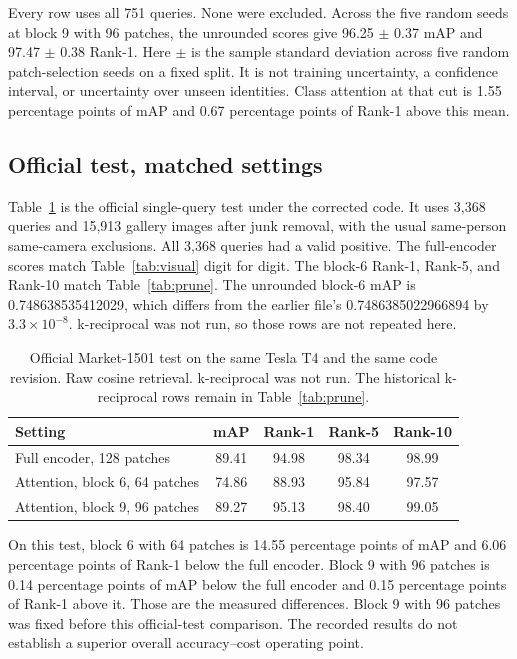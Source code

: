 \documentclass[11pt]{article}
\begin{document}
Every row uses all 751 queries. None were excluded.
Across the five random seeds at block 9 with 96 patches, the unrounded scores give 96.25 $\pm$ 0.37 mAP and 97.47 $\pm$ 0.38 Rank-1.
Here $\pm$ is the sample standard deviation across five random patch-selection seeds on a fixed split.
It is not training uncertainty, a confidence interval, or uncertainty over unseen identities.
Class attention at that cut is 1.55 percentage points of mAP and 0.67 percentage points of Rank-1 above this mean.

\FloatBarrier
\subsection{Official test, matched settings}
Table~\ref{tab:official} is the official single-query test under the corrected code.
It uses 3{,}368 queries and 15{,}913 gallery images after junk removal, with the usual same-person same-camera exclusions.
All 3{,}368 queries had a valid positive.
The full-encoder scores match Table~\ref{tab:visual} digit for digit.
The block-6 Rank-1, Rank-5, and Rank-10 match Table~\ref{tab:prune}.
The unrounded block-6 mAP is 0.748638535412029, which differs from the earlier file's 0.7486385022966894 by $3.3 \times 10^{-8}$.
k-reciprocal was not run, so those rows are not repeated here.

\begin{table}[t]
\centering
\caption{Official Market-1501 test on the same Tesla T4 and the same code revision. Raw cosine retrieval. k-reciprocal was not run. The historical k-reciprocal rows remain in Table~\ref{tab:prune}.}
\label{tab:official}
\small
\begin{tabular}{lcccc}
\toprule
Setting & mAP & Rank-1 & Rank-5 & Rank-10 \\
\midrule
Full encoder, 128 patches & 89.41 & 94.98 & 98.34 & 98.99 \\
Attention, block 6, 64 patches & 74.86 & 88.93 & 95.84 & 97.57 \\
Attention, block 9, 96 patches & 89.27 & 95.13 & 98.40 & 99.05 \\
\bottomrule
\end{tabular}
\end{table}

On this test, block 6 with 64 patches is 14.55 percentage points of mAP and 6.06 percentage points of Rank-1 below the full encoder.
Block 9 with 96 patches is 0.14 percentage points of mAP below the full encoder and 0.15 percentage points of Rank-1 above it.
Those are the measured differences.
Block 9 with 96 patches was fixed before this official-test comparison.
The recorded results do not establish a superior overall accuracy--cost operating point.
\end{document}

